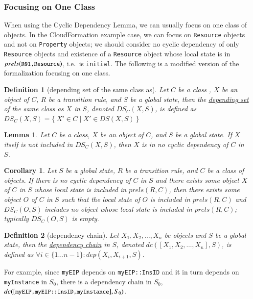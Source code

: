 \documentclass[12pt]{report}
\newtheorem{lemma}{Lemma}
\newtheorem{corollary}{Corollary}
\newtheorem{definition}{Definition}
\newcommand{\mbstt}[1]{\mbox{\small{\tt {#1}}}}
\newcommand{\ul}{\underline}
\begin{document}
\subsubsection{Focusing on One Class}
When using the Cyclic Dependency Lemma, we can usually focus on one
class of objects. In the CloudFormation example case, we can focus on
{\tt Resource} objects and not on {\tt Property} objects; we should
consider no cyclic dependency of only {\tt Resource} objects and
existence of a {\tt Resource} object whose local state is in
$prels(\mbstt{R01,Resource})$, i.e.\ is {\tt initial}. The following
is a modified version of the formalization focusing on one class.

\begin{definition}[depending set of the same class as]
Let $C$ be a class , $X$ be an object of $C$, $R$ be a transition
rule, and $S$ be a global state, then the \ul{depending set of the same
class as $X$ in $S$}, denoted \ul{$DS_C(X,S)$}, is defined
as $DS_C(X,S)=\{~X'\in C\mid X'\in DS(X,S)~\}$
\end{definition}
\begin{lemma}
Let $C$ be a class, $X$ be an object of $C$, and $S$ be a global
state. If $X$ itself is not included in $DS_C(X,S)$, then $X$ is in no
cyclic dependency of $C$ in $S$.
\end{lemma}
\begin{corollary}
Let $S$ be a global state, $R$ be a transition rule, and $C$ be a
class of objects. If there is no cyclic dependency of $C$ in $S$ and
there exists some object $X$ of $C$ in $S$ whose local state is
included in $prels(R,C)$, then there exists some object $O$ of $C$ in
$S$ such that the local state of $O$ is included in $prels(R,C)$ and
$DS_C(O,S)$ includes no object whose local state is included in
$prels(R,C)$; typically $DS_C(O,S)$ is empty.
\end{corollary}
\begin{definition}[dependency chain]
Let $X_1, X_2, \dots,X_n$ be objects and $S$ be a global state, then the
\ul{dependency chain} in $S$, denoted \ul{$dc([X_1, X_2,\dots,
    X_n],S)$}, is defined as $\forall i \in \{1 \dots n-1\} : dep(X_i,
X_{i+1},S)$.
\end{definition}
For example, since {\tt myEIP} depends on {\tt myEIP::InsID} and it in
turn depends on {\tt myInstance} in $S_0$, there is a dependency chain
in $S_0$, $dc([\mbstt{myEIP,myEIP::InsID,myInstance}],S_0)$.
\end{document}
